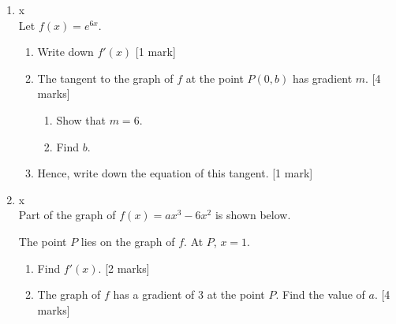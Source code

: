 \documentclass[12pt, twoside]{article}
\begin{document}
\begin{enumerate}
\newpage
  \item x\\
  Let $f(x)=e^{6x}$.
  \begin{enumerate}
    \item Write down $f'(x)$ [1 mark]
    \item The tangent to the graph of $f$ at the point $P(0,b)$ has gradient $m$.  [4 marks]
    \begin{enumerate}
      \item Show that $m=6$.
      \item Find $b$.
    \end{enumerate}
    \item Hence, write down the equation of this tangent. [1 mark]
  \end{enumerate}

  \item x\\
  Part of the graph of $f(x)= ax^3-6x^2$ is shown below.
    \begin{center}
    \end{center}

    The point $P$ lies on the graph of $f$. At $P$, $x=1$.
    \begin{enumerate}
      \item Find $f'(x)$. [2 marks]
      \item The graph of $f$ has a gradient of 3 at the point $P$. Find the value of $a$. [4 marks]
    \end{enumerate}

\end{enumerate}
\end{document}
